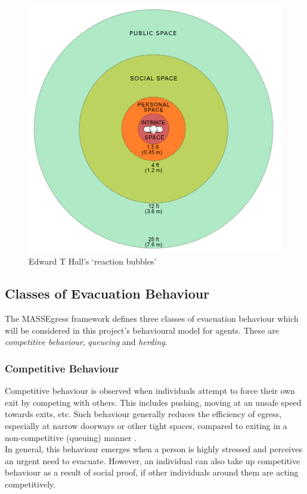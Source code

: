 \begin{figure}
\centering
\includegraphics[scale=0.4]{../images/Personal_Space.png}
\caption{Edward T Hall's `reaction bubbles'}
\label{fig:personalSpace}
\end{figure}


\subsection{Classes of Evacuation Behaviour}
\label{Res:subsec:behaviourClasses}
The MASSEgress framework \cite{MultiAgentFramework,PanMASSEgressThesis,IndivBehaviourPseudo} defines three classes of evacuation behaviour which will be considered in this project's behavioural model for agents. These are \emph{competitive behaviour}, \emph{queueing} and \emph{herding}.

\subsubsection{Competitive Behaviour}
\label{Res:subsubsec:competitive}
Competitive behaviour is observed when individuals attempt to force their own exit by competing with others. This includes pushing, moving at an unsafe speed towards exits, etc. Such behaviour generally reduces the efficiency of egress, especially at narrow doorways or other tight spaces\cite{BottleneckStudy}, compared to exiting in a non-competitive (queuing) manner \cite{EgressBehaviourKirchner}.\\
In general, this behaviour emerges when a person is highly stressed and perceives an urgent need to evacuate. However, an individual can also take up competitive behaviour as a result of social proof, if other individuals around them are acting competitively.
